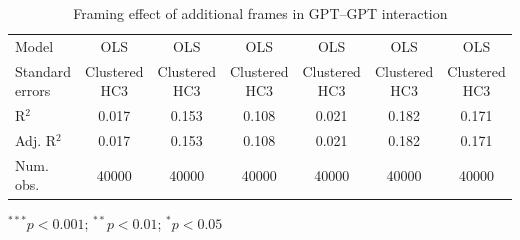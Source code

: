 \begin{table}[H]
\begin{center}
\begin{threeparttable}
{\begin{tabular}{l S[table-format=5.6] S[table-format=5.6] S[table-format=5.6] S[table-format=5.6] S[table-format=5.6] S[table-format=5.6]}
Model           & {OLS}                    & {OLS}                    & {OLS}                    & {OLS}                    & {OLS}                    & {OLS}                    \\
Standard errors & {{\small Clustered HC3}} & {{\small Clustered HC3}} & {{\small Clustered HC3}} & {{\small Clustered HC3}} & {{\small Clustered HC3}} & {{\small Clustered HC3}} \\
R$^2$           & 0.017                    & 0.153                    & 0.108                    & 0.021                    & 0.182                    & 0.171                    \\
Adj. R$^2$      & 0.017                    & 0.153                    & 0.108                    & 0.021                    & 0.182                    & 0.171                    \\
Num. obs.       &{40000}                   &{40000}                   &{40000}                   &{40000}                   &{40000}                   &{40000}                   \\
\bottomrule
\end{tabular}}
\begin{tablenotes}[flushleft]
\scriptsize{\item $^{***}p<0.001$; $^{**}p<0.01$; $^{*}p<0.05$}
\end{tablenotes}
\end{threeparttable}
\caption{Framing effect of additional frames in GPT--GPT interaction}
\label{rt4_models}
\end{center}
\end{table}

